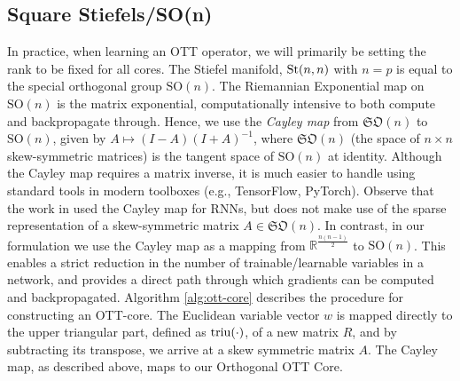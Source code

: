 \subsection{Square Stiefels/SO(n)}
In practice, when learning an OTT operator, we will primarily be setting the rank to be fixed for all cores.
The Stiefel manifold, $\text{St}(n,n)$ with $n=p$ is equal to the special orthogonal group $\text{SO}(n)$.
The Riemannian Exponential map on $\text{SO}(n)$ is the matrix exponential, computationally intensive to both compute and backpropagate through.
Hence, we use the \textit{Cayley map} from $\mathfrak{SO}(n)$ to $\text{SO}(n)$, given by $A \mapsto \left(I-A\right)\left(I+A\right)^{-1}$, where $\mathfrak{SO}(n)$ (the space of $n\times n$ skew-symmetric matrices) is the tangent space of $\text{SO}(n)$ at identity.
Although the Cayley map requires a matrix inverse, it is much easier to handle using standard tools
in modern toolboxes (e.g., TensorFlow, PyTorch).
Observe that
the work in \cite{helfrich2017orthogonal} used the Cayley map for RNNs, but does not make use of the sparse representation of a skew-symmetric matrix $A \in \mathfrak{SO}(n)$.
In contrast, in our formulation we use the Cayley map as a mapping from $\mathbb{R}^{\frac{n(n-1)}{2}}$ to $\text{SO}(n)$. This enables a strict reduction in the number of trainable/learnable variables in a network, and provides a direct path through which gradients can be computed and backpropagated.
Algorithm \ref{alg:ott-core} describes the procedure for constructing an OTT-core.
The Euclidean variable vector $w$ is mapped directly to the upper triangular part, defined as $\operatorname*{triu}(\cdot)$, of a new matrix $R$, and by subtracting its transpose,
we arrive at a skew symmetric matrix $A$. The Cayley map, as described above, maps to our Orthogonal OTT Core. 
